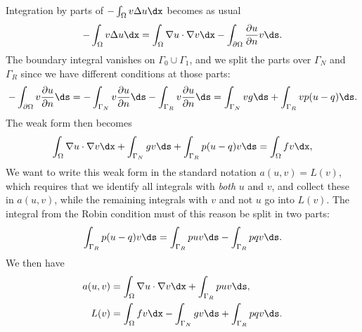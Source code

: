 Integration by parts of $-\int_\Omega v\Delta u\dx$ becomes as usual
\begin{equation}
 -\int_\Omega v\Delta u \dx
= \int_\Omega\nabla u\cdot \nabla v\dx
  - \int_{\partial\Omega} \frac{\partial u}{\partial n}v\ds.
\end{equation}
The boundary integral vanishes on $\Gamma_0\cup\Gamma_1$, and we split the
parts over $\Gamma_N$ and $\Gamma_R$ since we have different conditions
at those parts:
\begin{equation}
- \int_{\partial\Omega}v \frac{\partial u}{\partial n}\ds
=
-\int_{\Gamma_N}v \frac{\partial u}{\partial n}\ds
 - \int_{\Gamma_R}v \frac{\partial u}{\partial n}\ds
= \int_{\Gamma_N}vg\ds
+ \int_{\Gamma_R}vp(u-q)\ds.
\end{equation}
The weak form then becomes
\begin{equation}
\int_{\Omega} \nabla u\cdot \nabla v \dx
+ \int_{\Gamma_N} gv\ds + \int_{\Gamma_R}p(u-q)v\ds
= \int_{\Omega} fv \dx,
\end{equation}
We want to write this weak form in the standard notation $a(u,v)=L(v)$,
which requires that we identify all integrals with \emph{both} $u$ and
$v$, and collect these in $a(u,v)$, while the remaining integrals with
$v$ and not $u$ go into $L(v)$.  The integral from the Robin condition
must of this reason be split in two parts:
\begin{equation}
 \int_{\Gamma_R}p(u-q)v\ds
= \int_{\Gamma_R}puv\ds - \int_{\Gamma_R}pqv\ds.
\end{equation}
We then have
\begin{align}
  a(u, v) &= \int_{\Omega} \nabla u\cdot \nabla v \dx
    + \int_{\Gamma_R}puv\ds,
  \label{langtangen:poisson:2D:DN3:var:a}
\\
  L(v) &= \int_{\Omega} fv \dx - \int_{\Gamma_N} g v\ds + \int_{\Gamma_R}pqv\ds.
  \label{langtangen:poisson:2D:DN3:var:L}
\end{align}

